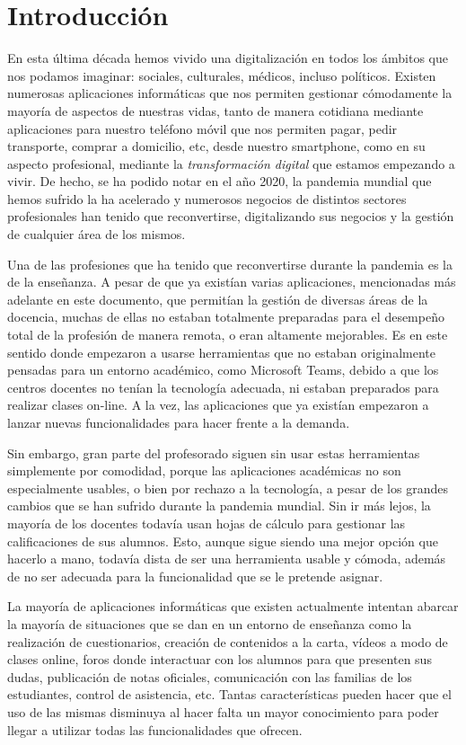 
\chapter{Introducción}
\label{cap:Introduccion}
En esta última década hemos vivido una digitalización en todos los ámbitos que nos podamos imaginar: sociales, culturales, médicos, incluso políticos. Existen numerosas aplicaciones informáticas que nos permiten gestionar cómodamente la mayoría de aspectos de nuestras vidas, tanto de manera cotidiana mediante aplicaciones para nuestro teléfono móvil que nos permiten pagar, pedir transporte, comprar a domicilio, etc, desde nuestro smartphone, como en su aspecto profesional, mediante la \textit{transformación digital} que estamos empezando a vivir. De hecho, se ha podido notar en el año 2020, la pandemia mundial que hemos sufrido la ha acelerado y numerosos negocios de distintos sectores profesionales han tenido que reconvertirse, digitalizando sus negocios y la gestión de cualquier área de los mismos.

Una de las profesiones que ha tenido que reconvertirse durante la pandemia es la de la enseñanza. A pesar de que ya existían varias aplicaciones, mencionadas más adelante en este documento, que permitían la gestión de diversas áreas de la docencia, muchas de ellas no estaban totalmente preparadas para el desempeño total de la profesión de manera remota, o eran altamente mejorables. Es en este sentido donde empezaron a usarse herramientas que no estaban originalmente pensadas para un entorno académico, como Microsoft Teams, debido a que los centros docentes no tenían la tecnología adecuada, ni estaban preparados para realizar clases on-line\cite{fletcher2020digital}. A la vez, las aplicaciones que ya existían empezaron a lanzar nuevas funcionalidades para hacer frente a la demanda.

Sin embargo, gran parte del profesorado siguen sin usar estas herramientas simplemente por comodidad, porque las aplicaciones académicas no son especialmente usables, o bien por rechazo a la tecnología, a pesar de los grandes cambios que se han sufrido durante la pandemia mundial. Sin ir más lejos, la mayoría de los docentes todavía usan hojas de cálculo para gestionar las calificaciones de sus alumnos. Esto, aunque sigue siendo una mejor opción que hacerlo a mano, todavía dista de ser una herramienta usable y cómoda, además de no ser adecuada para la funcionalidad que se le pretende asignar.

La mayoría de aplicaciones informáticas que existen actualmente intentan abarcar la mayoría de situaciones que se dan en un entorno de enseñanza como la realización de cuestionarios, creación de contenidos a la carta, vídeos a modo de clases online, foros donde interactuar con los alumnos para que presenten sus dudas, publicación de notas oficiales, comunicación con las familias de los estudiantes, control de asistencia, etc. Tantas características pueden hacer que el uso de las mismas disminuya al hacer falta un mayor conocimiento para poder llegar a utilizar todas las funcionalidades que ofrecen.


